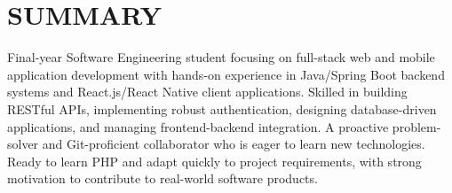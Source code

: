 \section{SUMMARY}
\noindent Final-year Software Engineering student focusing on full-stack web and mobile application development with hands-on experience in Java/Spring Boot backend systems and React.js/React Native client applications. Skilled in building RESTful APIs, implementing robust authentication, designing database-driven applications, and managing frontend-backend integration. A proactive problem-solver and Git-proficient collaborator who is eager to learn new technologies. Ready to learn PHP and adapt quickly to project requirements, with strong motivation to contribute to real-world software products.
